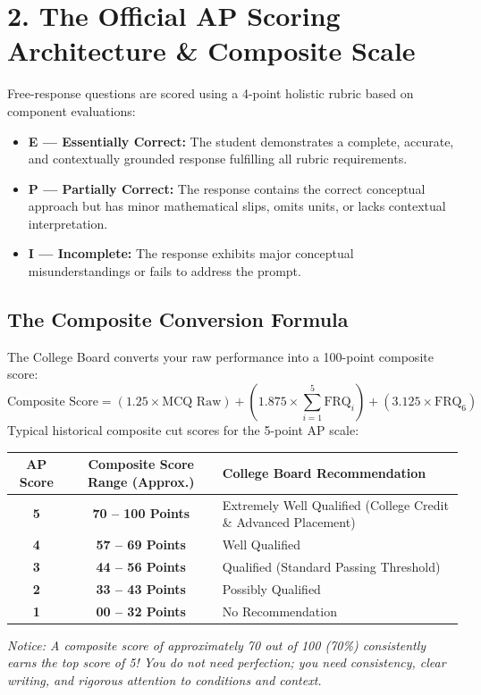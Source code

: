 \section*{2. The Official AP Scoring Architecture \& Composite Scale}
Free-response questions are scored using a 4-point holistic rubric based on component evaluations:
\begin{itemize}[leftmargin=1.5em]
  \item \textbf{E --- Essentially Correct:} The student demonstrates a complete, accurate, and contextually grounded response fulfilling all rubric requirements.
  \item \textbf{P --- Partially Correct:} The response contains the correct conceptual approach but has minor mathematical slips, omits units, or lacks contextual interpretation.
  \item \textbf{I --- Incomplete:} The response exhibits major conceptual misunderstandings or fails to address the prompt.
\end{itemize}

\subsection*{The Composite Conversion Formula}
The College Board converts your raw performance into a 100-point composite score:
\[ \text{Composite Score} = (1.25 \times \text{MCQ Raw}) + (1.875 \times \sum_{i=1}^5 \text{FRQ}_i) + (3.125 \times \text{FRQ}_6) \]
Typical historical composite cut scores for the 5-point AP scale:
\begin{center}
\begin{tabular}{ccl}
\toprule
\textbf{AP Score} & \textbf{Composite Score Range (Approx.)} & \textbf{College Board Recommendation} \\
\midrule
\textbf{5} & \textbf{70 -- 100 Points} & Extremely Well Qualified (College Credit \& Advanced Placement) \\
\textbf{4} & \textbf{57 -- 69 Points} & Well Qualified \\
\textbf{3} & \textbf{44 -- 56 Points} & Qualified (Standard Passing Threshold) \\
\textbf{2} & \textbf{33 -- 43 Points} & Possibly Qualified \\
\textbf{1} & \textbf{00 -- 32 Points} & No Recommendation \\
\bottomrule
\end{tabular}
\end{center}
\textit{Notice: A composite score of approximately 70 out of 100 (70\%) consistently earns the top score of 5! You do not need perfection; you need consistency, clear writing, and rigorous attention to conditions and context.}

